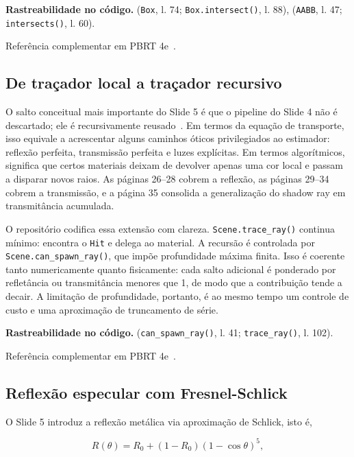 \documentclass[portuguese]{sbcreviews-2025}%
\newcommand{\slidescite}[2]{\citep[pp.~#2]{#1}}
\newcommand{\pbrtsec}[1]{PBRT 4e~\citep[Se\c{c}\~ao~#1]{pharr2023pbrt}}
\begin{document}
\noindent\textbf{Rastreabilidade no código.}  (\texttt{Box}, l. 74; \texttt{Box.intersect()}, l. 88),  (\texttt{AABB}, l. 47; \texttt{intersects()}, l. 60).

Referência complementar em \pbrtsec{3.7}.

\subsection{De traçador local a traçador recursivo}
\label{sec:slide5-recursao}

O salto conceitual mais importante do Slide 5 é que o pipeline do Slide 4 não é descartado; ele é recursivamente reusado~\slidescite{inf2608slides05}{26--35}. Em termos da equação de transporte, isso equivale a acrescentar alguns caminhos óticos privilegiados ao estimador: reflexão perfeita, transmissão perfeita e luzes explícitas. Em termos algorítmicos, significa que certos materiais deixam de devolver apenas uma cor local e passam a disparar novos raios. As páginas 26--28 cobrem a reflexão, as páginas 29--34 cobrem a transmissão, e a página 35 consolida a generalização do shadow ray em transmitância acumulada.

O repositório codifica essa extensão com clareza. \texttt{Scene.trace\_ray()} continua mínimo: encontra o \texttt{Hit} e delega ao material. A recursão é controlada por \texttt{Scene.can\_spawn\_ray()}, que impõe profundidade máxima finita. Isso é coerente tanto numericamente quanto fisicamente: cada salto adicional é ponderado por refletância ou transmitância menores que 1, de modo que a contribuição tende a decair. A limitação de profundidade, portanto, é ao mesmo tempo um controle de custo e uma aproximação de truncamento de série.

\noindent\textbf{Rastreabilidade no código.}  (\texttt{can\_spawn\_ray()}, l. 41; \texttt{trace\_ray()}, l. 102).

Referência complementar em \pbrtsec{1.2}.

\subsection{Reflexão especular com Fresnel-Schlick}
\label{sec:slide5-fresnel}

O Slide 5 introduz a reflexão metálica via aproximação de Schlick, isto é,

\[
R(\theta)=R_0 + (1-R_0)(1-\cos\theta)^5,
\]
\end{document}
